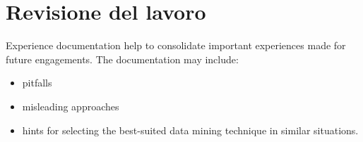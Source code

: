 \section{Revisione del lavoro}
Experience documentation help to consolidate important
experiences made for future engagements. The documentation
may include:
\begin{itemize}
	\item pitfalls
	\item misleading approaches
	\item hints for selecting the best-suited data mining technique in similar situations.
\end{itemize}
